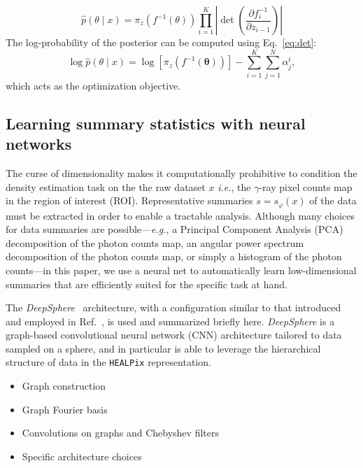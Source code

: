 \documentclass[prd,aps,10pt,nofootinbib,twocolumn,superscriptaddress,preprintnumbers,balancelastpage,longbibliography]{revtex4-1}
\begin{document}
\begin{equation}
    \hat{p}({\theta} \mid {x})=\pi_{z}\left(f^{-1}({\theta})\right) \prod_{i=1}^{K}\left|\operatorname{det}\left(\frac{\partial f_{i}^{-1}}{\partial {z}_{i-1}}\right)\right|
\end{equation}
The log-probability of the posterior can be computed using Eq.~\ref{eq:det}:
\begin{equation}
    \log \hat{p}({\theta} \mid {x}) = \log \left[\pi_{z}\left(f^{-1}(\boldsymbol{\theta})\right)\right]-\sum_{i=1}^{K} \sum_{j=1}^{N} \alpha_{j}^{i},
\end{equation}
which acts as the optimization objective.

\subsection{Learning summary statistics with neural networks}

The curse of dimensionality makes it computationally prohibitive to condition the density estimation task on the the raw dataset $x$ \emph{i.e.}, the $\gamma$-ray pixel counts map in the region of interest (ROI). Representative summaries $s = s_\varphi(x)$ of the data must be extracted in order to enable a tractable analysis. Although many choices for data summaries are possible---\emph{e.g.}, a Principal Component Analysis (PCA) decomposition of the photon counts map, an angular power spectrum decomposition of the photon counts map, or simply a histogram of the photon counts---in this paper, we use a neural net to automatically learn low-dimensional summaries that are efficiently suited for the specific task at hand.

The \emph{DeepSphere}~\cite{defferrard2020deepsphere,Perraudin:2018rbt} architecture, with a configuration similar to that introduced and employed in Ref.~\cite{List:2020mzd}, is used and summarized briefly here. \emph{DeepSphere} is a graph-based convolutional neural network (CNN) architecture tailored to data sampled on a sphere, and in particular is able to leverage the hierarchical structure of data in the \texttt{HEALPix} representation.

\begin{itemize}
    \item Graph construction
    \item Graph Fourier basis
    \item Convolutions on graphs and Chebyshev filters
    \item Specific architecture choices
\end{itemize}
\end{document}
